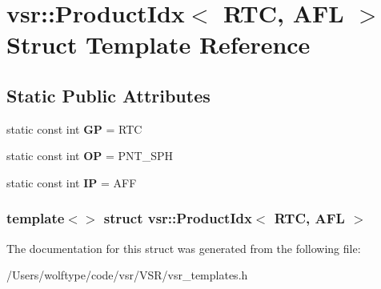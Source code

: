 \hypertarget{structvsr_1_1_product_idx_3_01_r_t_c_00_01_a_f_l_01_4}{\section{vsr\-:\-:Product\-Idx$<$ R\-T\-C, A\-F\-L $>$ Struct Template Reference}
\label{structvsr_1_1_product_idx_3_01_r_t_c_00_01_a_f_l_01_4}
}
\subsection*{Static Public Attributes}
\begin{DoxyCompactItemize}
\item 
\hypertarget{structvsr_1_1_product_idx_3_01_r_t_c_00_01_a_f_l_01_4_a7d0f492b6eaf39492c97efcd5509d6e6}{static const int {\bfseries G\-P} = R\-T\-C}\label{structvsr_1_1_product_idx_3_01_r_t_c_00_01_a_f_l_01_4_a7d0f492b6eaf39492c97efcd5509d6e6}

\item 
\hypertarget{structvsr_1_1_product_idx_3_01_r_t_c_00_01_a_f_l_01_4_a0e0dfcc77e52c942cd5b3c5e7dec9752}{static const int {\bfseries O\-P} = P\-N\-T\-\_\-\-S\-P\-H}\label{structvsr_1_1_product_idx_3_01_r_t_c_00_01_a_f_l_01_4_a0e0dfcc77e52c942cd5b3c5e7dec9752}

\item 
\hypertarget{structvsr_1_1_product_idx_3_01_r_t_c_00_01_a_f_l_01_4_acf39bcacd1149e0d114460854061a008}{static const int {\bfseries I\-P} = A\-F\-F}\label{structvsr_1_1_product_idx_3_01_r_t_c_00_01_a_f_l_01_4_acf39bcacd1149e0d114460854061a008}

\end{DoxyCompactItemize}
\subsubsection*{template$<$$>$ struct vsr\-::\-Product\-Idx$<$ R\-T\-C, A\-F\-L $>$}



The documentation for this struct was generated from the following file\-:\begin{DoxyCompactItemize}
\item 
/\-Users/wolftype/code/vsr/\-V\-S\-R/vsr\-\_\-templates.\-h\end{DoxyCompactItemize}
